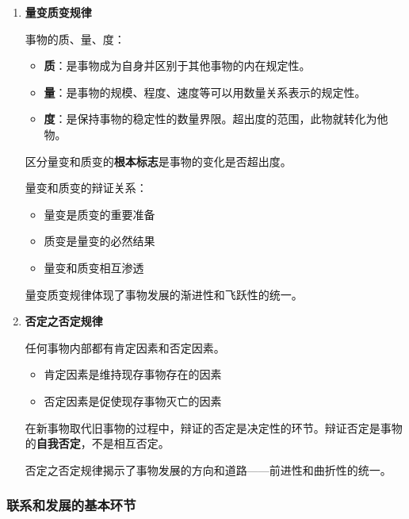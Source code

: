 \documentclass[12pt, a4paper, oneside]{ctexart}
\begin{document}
\begin{enumerate}
  \item {\bf 量变质变规律}
  
  事物的质、量、度：
  \begin{itemize}
    \item {\bf 质}：是事物成为自身并区别于其他事物的内在规定性。
    \item {\bf 量}：是事物的规模、程度、速度等可以用数量关系表示的规定性。
    \item {\bf 度}：是保持事物的稳定性的数量界限。超出度的范围，此物就转化为他物。
  \end{itemize}

  区分量变和质变的\textbf{根本标志}是事物的变化是否超出度。

  量变和质变的辩证关系：
  \begin{itemize}
    \item 量变是质变的重要准备
    \item 质变是量变的必然结果
    \item 量变和质变相互渗透
  \end{itemize}

  量变质变规律体现了事物发展的渐进性和飞跃性的统一。

  \item {\bf 否定之否定规律}
  
  任何事物内部都有肯定因素和否定因素。
  \begin{itemize}
    \item 肯定因素是维持现存事物存在的因素
    \item 否定因素是促使现存事物灭亡的因素
  \end{itemize}

  在新事物取代旧事物的过程中，辩证的否定是决定性的环节。辩证否定是事物的\textbf{自我否定}，不是相互否定。

  否定之否定规律揭示了事物发展的方向和道路——前进性和曲折性的统一。
\end{enumerate}

\subsubsection{联系和发展的基本环节}
\end{document}
